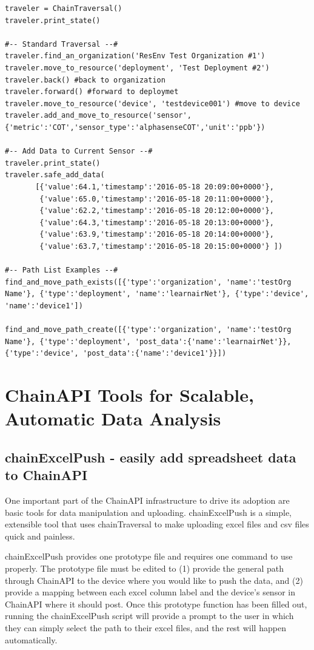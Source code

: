 \begin{lstlisting}[style=code]
traveler = ChainTraversal()
traveler.print_state()

#-- Standard Traversal --#
traveler.find_an_organization('ResEnv Test Organization #1')
traveler.move_to_resource('deployment', 'Test Deployment #2')
traveler.back() #back to organization
traveler.forward() #forward to deploymet
traveler.move_to_resource('device', 'testdevice001') #move to device
traveler.add_and_move_to_resource('sensor', {'metric':'COT','sensor_type':'alphasenseCOT','unit':'ppb'})
    
#-- Add Data to Current Sensor --#
traveler.print_state()
traveler.safe_add_data(
       [{'value':64.1,'timestamp':'2016-05-18 20:09:00+0000'},
        {'value':65.0,'timestamp':'2016-05-18 20:11:00+0000'},
        {'value':62.2,'timestamp':'2016-05-18 20:12:00+0000'},
        {'value':64.3,'timestamp':'2016-05-18 20:13:00+0000'},
        {'value':63.9,'timestamp':'2016-05-18 20:14:00+0000'},
        {'value':63.7,'timestamp':'2016-05-18 20:15:00+0000'} ])

#-- Path List Examples --#
find_and_move_path_exists([{'type':'organization', 'name':'testOrg Name'}, {'type':'deployment', 'name':'learnairNet'}, {'type':'device', 'name':'device1'])

find_and_move_path_create([{'type':'organization', 'name':'testOrg Name'}, {'type':'deployment', 'post_data':{'name':'learnairNet'}}, {'type':'device', 'post_data':{'name':'device1'}}])
\end{lstlisting}


\section{ChainAPI Tools for Scalable, Automatic Data Analysis}  

\subsection{chainExcelPush - easily add spreadsheet data to ChainAPI}

One important part of the ChainAPI infrastructure to drive its adoption are basic tools for data manipulation and uploading.  chainExcelPush is a simple, extensible tool that uses chainTraversal to make uploading excel files and csv files quick and painless.

chainExcelPush provides one prototype file and requires one command to use properly.  The prototype file must be edited to (1) provide the general path through ChainAPI to the device where you would like to push the data, and (2) provide a mapping between each excel column label and the device's sensor in ChainAPI where it should post.  Once this prototype function has been filled out, running the chainExcelPush script will provide a prompt to the user in which they can simply select the path to their excel files, and the rest will happen automatically.


